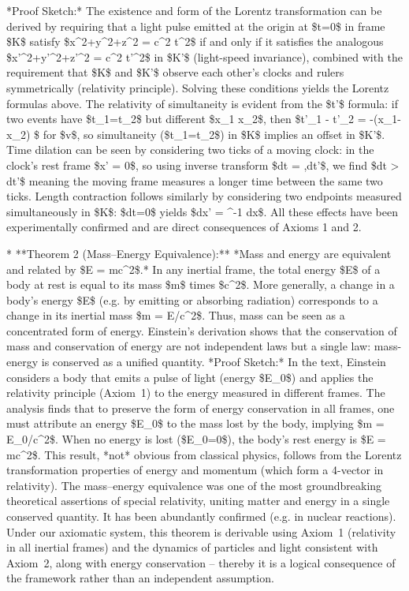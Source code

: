 \documentclass{article}
\begin{document}
  *Proof Sketch:* The existence and form of the Lorentz transformation can be derived by requiring that a light pulse emitted at the origin at \$t=0\$ in frame \$K\$ satisfy \$x^2+y^2+z^2 = c^2 t^2\$ if and only if it satisfies the analogous \$x'^2+y'^2+z'^2 = c^2 t'^2\$ in \$K'\$ (light-speed invariance), combined with the requirement that \$K\$ and \$K'\$ observe each other’s clocks and rulers symmetrically (relativity principle). Solving these conditions yields the Lorentz formulas above. The relativity of simultaneity is evident from the \$t'\$ formula: if two events have \$t\_1=t\_2\$ but different \$x\_1 \neq x\_2\$, then \$t'\_1 - t'\_2 = -\gamma {}(x\_1-x\_2) \$ for \$v\$, so simultaneity (\$t\_1=t\_2\$) in \$K\$ implies an offset in \$K'\$. Time dilation can be seen by considering two ticks of a moving clock: in the clock’s rest frame \$\Delta x' = 0\$, so using inverse transform \$dt = \gamma,dt'\$, we find \$dt > dt'\$ meaning the moving frame measures a longer time between the same two ticks. Length contraction follows similarly by considering two endpoints measured simultaneously in \$K\$: \$dt=0\$ yields \$dx' = \gamma^{-1} dx\$. All these effects have been experimentally confirmed and are direct consequences of Axioms 1 and 2.\*

* **Theorem 2 (Mass–Energy Equivalence):** *Mass and energy are equivalent and related by \$E = mc^2\$.* In any inertial frame, the total energy \$E\$ of a body at rest is equal to its mass \$m\$ times \$c^2\$. More generally, a change in a body's energy \$\Delta E\$ (e.g. by emitting or absorbing radiation) corresponds to a change in its inertial mass \$\Delta m = \Delta E/c^2\$. Thus, mass can be seen as a concentrated form of energy. Einstein’s derivation shows that the conservation of mass and conservation of energy are not independent laws but a single law: mass-energy is conserved as a unified quantity. *Proof Sketch:* In the text, Einstein considers a body that emits a pulse of light (energy \$E\_0\$) and applies the relativity principle (Axiom 1) to the energy measured in different frames. The analysis finds that to preserve the form of energy conservation in all frames, one must attribute an energy \$E\_0\$ to the mass lost by the body, implying \$\Delta m = E\_0/c^2\$. When no energy is lost (\$E\_0=0\$), the body’s rest energy is \$E = mc^2\$. This result, *not* obvious from classical physics, follows from the Lorentz transformation properties of energy and momentum (which form a 4-vector in relativity). The mass–energy equivalence was one of the most groundbreaking theoretical assertions of special relativity, uniting matter and energy in a single conserved quantity. It has been abundantly confirmed (e.g. in nuclear reactions). Under our axiomatic system, this theorem is derivable using Axiom 1 (relativity in all inertial frames) and the dynamics of particles and light consistent with Axiom 2, along with energy conservation – thereby it is a logical consequence of the framework rather than an independent assumption.\*
\end{document}
